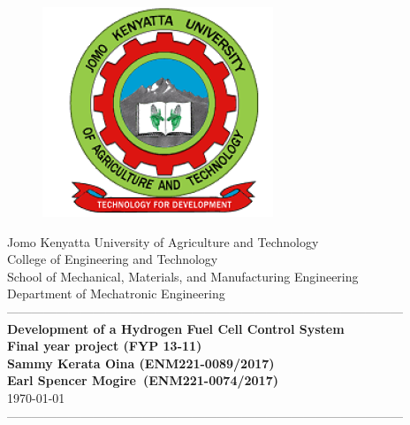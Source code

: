 \documentclass[12pt,fleqn]{article}
\begin{document}
\begin{titlepage}
  \begin{center}
      \vspace*{-4.0cm}
    \begin{figure}[!h]
\centering
\includegraphics[width=0.3\linewidth]{Figures/JKUAT_logo}
\label{fig:jomologo}
\end{figure}
   \large{Jomo Kenyatta University of Agriculture and Technology}\\
    \large{College of Engineering and Technology}\\
    \large{School of Mechanical, Materials, and Manufacturing Engineering}\\
   \large{Department of Mechatronic Engineering}\\

    ------------------------------------------------------------------------------------------------\\[1.0cm]
    \LARGE{\textbf{Development of a Hydrogen Fuel Cell Control System}}\\[0.6cm]
    \LARGE{\textbf{Final year project (FYP 13-11)
            }}\\[1.5cm]

    \vspace{0.5cm}
    \large{\textbf{Sammy Kerata Oina (ENM221-0089/2017)
            }}\\
     \large{\textbf{Earl Spencer Mogire~(ENM221-0074/2017)
            }}\\[1.0cm]
    \large{\small{\today}}\\
    ------------------------------------------------------------------------------------------------\\[1.5cm]
  \end{center}
\end{titlepage}
%
\end{document}
